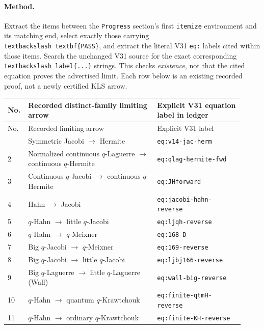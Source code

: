 \documentclass[11pt]{article}
\begin{document}
\paragraph{Method.} Extract the items between the \texttt{Progress} section's first \texttt{itemize} environment and its matching end, select exactly those carrying \texttt{\\textbackslash textbf\{PASS\}}, and extract the literal V31 \texttt{eq:} labels cited within those items. Search the unchanged V31 source for the exact corresponding \texttt{\\textbackslash label\{...\}} strings. This checks \emph{existence}, not that the cited equation proves the advertised limit. Each row below is an existing recorded proof, not a newly certified KLS arrow.

\begingroup\small
\begin{longtable}{@{}p{0.05\linewidth}p{0.52\linewidth}p{0.35\linewidth}@{}}
\toprule No. & Recorded distinct-family limiting arrow & Explicit V31 equation label in ledger \\
\midrule\endfirsthead
\toprule No. & Recorded limiting arrow & Explicit V31 label \\
\midrule\endhead
\bottomrule\endfoot
1 & Symmetric Jacobi $\ensuremath{\to}$ Hermite & \texttt{eq:v14-jac-herm} \\
2 & Normalized continuous $q$-Laguerre $\ensuremath{\to}$ continuous $q$-Hermite & \texttt{eq:qlag-hermite-fwd} \\
3 & Continuous $q$-Jacobi $\ensuremath{\to}$ continuous $q$-Hermite & \texttt{eq:JHforward} \\
4 & Hahn $\ensuremath{\to}$ Jacobi & \texttt{eq:jacobi-hahn-reverse} \\
5 & $q$-Hahn $\ensuremath{\to}$ little $q$-Jacobi & \texttt{eq:ljqh-reverse} \\
6 & $q$-Hahn $\ensuremath{\to}$ $q$-Meixner & \texttt{eq:168-D} \\
7 & Big $q$-Jacobi $\ensuremath{\to}$ $q$-Meixner & \texttt{eq:169-reverse} \\
8 & Big $q$-Jacobi $\ensuremath{\to}$ little $q$-Jacobi & \texttt{eq:ljbj166-reverse} \\
9 & Big $q$-Laguerre $\ensuremath{\to}$ little $q$-Laguerre (Wall) & \texttt{eq:wall-big-reverse} \\
10 & $q$-Hahn $\ensuremath{\to}$ quantum $q$-Krawtchouk & \texttt{eq:finite-qtmH-reverse} \\
11 & $q$-Hahn $\ensuremath{\to}$ ordinary $q$-Krawtchouk & \texttt{eq:finite-KH-reverse} \\

\end{longtable}
\end{document}
